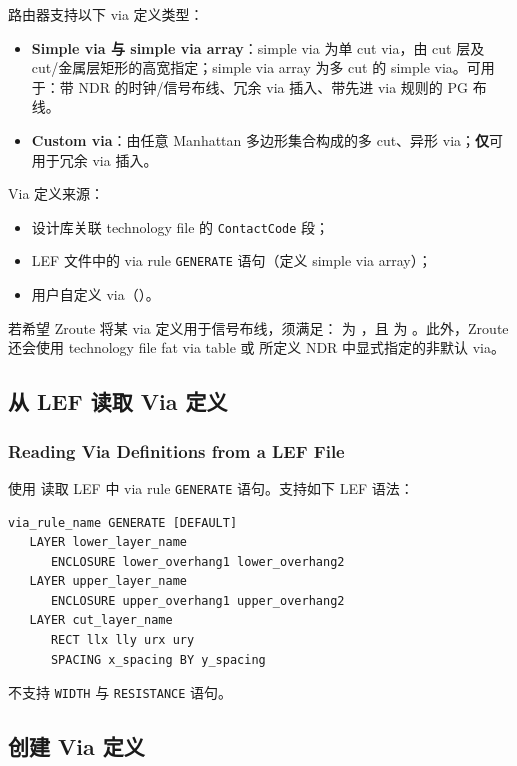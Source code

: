 路由器支持以下 via 定义类型：
\begin{itemize}
  \item \textbf{Simple via 与 simple via array}：simple via 为单 cut via，由 cut 层及 cut/金属层矩形的高宽指定；simple via array 为多 cut 的 simple via。可用于：带 NDR 的时钟/信号布线、冗余 via 插入、带先进 via 规则的 PG 布线。
  \item \textbf{Custom via}：由任意 Manhattan 多边形集合构成的多 cut、异形 via；\textbf{仅}可用于冗余 via 插入。
\end{itemize}

Via 定义来源：
\begin{itemize}
  \item 设计库关联 technology file 的 \texttt{ContactCode} 段；
  \item LEF 文件中的 via rule \texttt{GENERATE} 语句（定义 simple via array）；
  \item 用户自定义 via（）。
\end{itemize}

若希望 Zroute 将某 via 定义用于信号布线，须满足： 为 ，且  为 。此外，Zroute 还会使用 technology file fat via table 或  所定义 NDR 中显式指定的非默认 via。

\subsection{从 LEF 读取 Via 定义}
\subsubsection*{Reading Via Definitions from a LEF File}

使用  读取 LEF 中 via rule \texttt{GENERATE} 语句。支持如下 LEF 语法：
\begin{lstlisting}
via_rule_name GENERATE [DEFAULT]
   LAYER lower_layer_name
      ENCLOSURE lower_overhang1 lower_overhang2
   LAYER upper_layer_name
      ENCLOSURE upper_overhang1 upper_overhang2
   LAYER cut_layer_name
      RECT llx lly urx ury
      SPACING x_spacing BY y_spacing
\end{lstlisting}
不支持 \texttt{WIDTH} 与 \texttt{RESISTANCE} 语句。

\subsection{创建 Via 定义}
